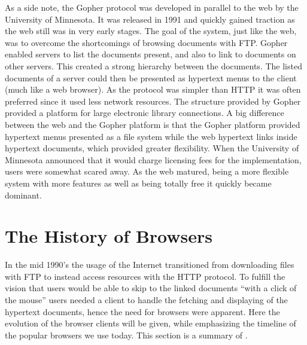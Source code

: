    As a side note, the Gopher protocol was developed in parallel to the web by the University of Minnesota.
    It was released in 1991 and quickly gained traction as the \gls{web} still was in very early stages.
    The goal of the system, just like the \gls{web}, was to overcome the shortcomings of browsing \glspl{document} with \gls{FTP}.
    Gopher enabled servers to list the \glspl{document} present, and also to link to \glspl{document} on other servers.
    This created a strong hierarchy between the \glspl{document}.
    The listed \glspl{document} of a server could then be presented as \gls{hypertext} menus to the client (much like a \gls{web} \gls{browser}).
    As the protocol was simpler than \gls{HTTP} it was often preferred since it used less network resources.
    The structure provided by Gopher provided a platform for large electronic library connections.
    A big difference between the \gls{web} and the Gopher platform is that the Gopher platform provided \gls{hypertext} menus presented as a file system while the \gls{web} \gls{hypertext} links inside \gls{hypertext} \glspl{document}, which provided greater flexibility.
    When the University of Minnesota announced that it would charge licensing fees for the implementation, users were somewhat scared away.
    As the \gls{web} matured, being a more flexible system with more features as well as being totally free it quickly became dominant.

  \section{The History of Browsers}
    \label{sec:browsers}
    In the mid 1990's the usage of the Internet transitioned from downloading files with \gls{FTP} to instead access resources with the \gls{HTTP} protocol.
    To fulfill the vision that users would be able to skip to the linked \glspl{document} ``with a click of the mouse'' users needed a client to handle the fetching and displaying of the \gls{hypertext} \glspl{document}, hence the need for \glspl{browser} were apparent.
    Here the evolution of the \gls{browser} clients will be given, while emphasizing the timeline of the popular \glspl{browser} we use today.
    This section is a summary of .

